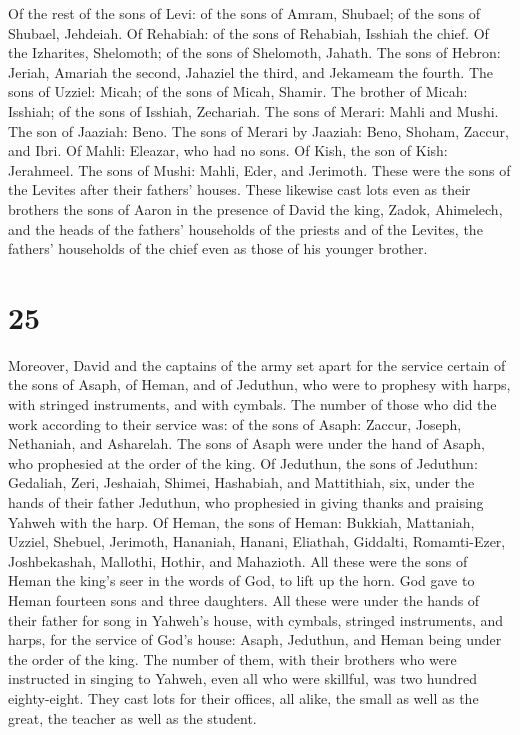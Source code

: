  Of the rest of the sons of Levi: of the sons of Amram,
Shubael; of the sons of Shubael, Jehdeiah.  Of Rehabiah:
of the sons of Rehabiah, Isshiah the chief.  Of the
Izharites, Shelomoth; of the sons of Shelomoth, Jahath. 
The sons of Hebron: Jeriah, Amariah the second, Jahaziel the third, and
Jekameam the fourth.  The sons of Uzziel: Micah; of the
sons of Micah, Shamir.  The brother of Micah: Isshiah; of
the sons of Isshiah, Zechariah.  The sons of Merari:
Mahli and Mushi. The son of Jaaziah: Beno.  The sons of
Merari by Jaaziah: Beno, Shoham, Zaccur, and Ibri.  Of
Mahli: Eleazar, who had no sons.  Of Kish, the son of
Kish: Jerahmeel.  The sons of Mushi: Mahli, Eder, and
Jerimoth. These were the sons of the Levites after their fathers'
houses.  These likewise cast lots even as their brothers
the sons of Aaron in the presence of David the king, Zadok, Ahimelech,
and the heads of the fathers' households of the priests and of the
Levites, the fathers' households of the chief even as those of his
younger brother.

\hypertarget{section-24}{%
\section{25}\label{section-24}}

 Moreover, David and the captains of the army set apart
for the service certain of the sons of Asaph, of Heman, and of Jeduthun,
who were to prophesy with harps, with stringed instruments, and with
cymbals. The number of those who did the work according to their service
was:  of the sons of Asaph: Zaccur, Joseph, Nethaniah, and
Asharelah. The sons of Asaph were under the hand of Asaph, who
prophesied at the order of the king.  Of Jeduthun, the
sons of Jeduthun: Gedaliah, Zeri, Jeshaiah, Shimei, Hashabiah, and
Mattithiah, six, under the hands of their father Jeduthun, who
prophesied in giving thanks and praising Yahweh with the harp.
 Of Heman, the sons of Heman: Bukkiah, Mattaniah, Uzziel,
Shebuel, Jerimoth, Hananiah, Hanani, Eliathah, Giddalti, Romamti-Ezer,
Joshbekashah, Mallothi, Hothir, and Mahazioth.  All these
were the sons of Heman the king's seer in the words of God, to lift up
the horn. God gave to Heman fourteen sons and three daughters.
 All these were under the hands of their father for song
in Yahweh's house, with cymbals, stringed instruments, and harps, for
the service of God's house: Asaph, Jeduthun, and Heman being under the
order of the king.  The number of them, with their
brothers who were instructed in singing to Yahweh, even all who were
skillful, was two hundred eighty-eight.  They cast lots
for their offices, all alike, the small as well as the great, the
teacher as well as the student.

